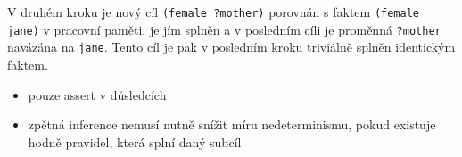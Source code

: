 V druhém kroku je nový cíl \verb|(female ?mother)| porovnán s faktem
\verb|(female jane)| v pracovní paměti, je jím splněn a v posledním cíli je
proměnná \verb|?mother| navázána na \verb|jane|. Tento cíl je pak
v posledním kroku triviálně splněn identickým faktem.


\begin{framed}
  \begin{itemize}
    \item pouze assert v důsledcích
    \item zpětná inference nemusí nutně snížit míru nedeterminismu, pokud
    existuje hodně pravidel, která splní daný subcíl
  \end{itemize}
\end{framed}
